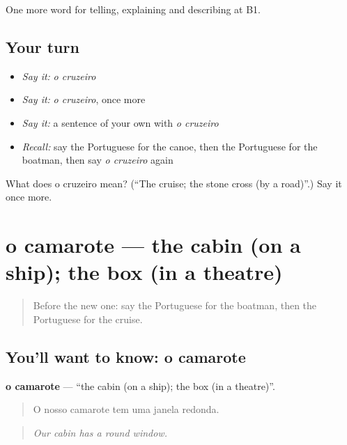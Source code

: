 \begin{grammarlens}[title={What you've built}]
One more word for telling, explaining and describing at B1.
\end{grammarlens}

\subsection*{Your turn}
\begin{itemize}
\raggedright
  \item \emph{Say it:} \emph{o cruzeiro}
  \item \emph{Say it:} \emph{o cruzeiro}, once more
  \item \emph{Say it:} a sentence of your own with \emph{o cruzeiro}
  \item \emph{Recall:} say the Portuguese for the canoe, then the Portuguese for the boatman, then say \emph{o cruzeiro} again
\end{itemize}

\begin{tcolorbox}[breakable,colback=teal!4,colframe=teal!35!black,title={Before you move on}]
What does o cruzeiro mean? (\textquotedblleft{}The cruise; the stone cross (by a road)\textquotedblright{}.) Say it once more.
\end{tcolorbox}
\section[o camarote]{o camarote — the cabin (on a ship); the box (in a theatre)}

\label{lesson:PT-C419-camarote}



\begin{quote}
Before the new one: say the Portuguese for the boatman, then the Portuguese for the cruise.
\end{quote}

\subsection*{You'll want to know: o camarote}
\textbf{o camarote} — \textquotedblleft{}the cabin (on a ship); the box (in a theatre)\textquotedblright{}.

\begin{quote}
O nosso camarote tem uma janela redonda.
\end{quote}

\begin{quote}
\emph{Our cabin has a round window.}
\end{quote}


